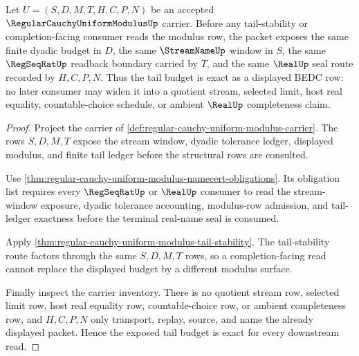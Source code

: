 \begin{theorem}
\label{thm:regular-cauchy-uniform-modulus-tail-budget-exactness}
Let $U=(S,D,M,T,H,C,P,N)$ be an accepted
$\RegularCauchyUniformModulusUp$ carrier. Before any tail-stability or completion-facing consumer reads the modulus row, the packet exposes the same finite dyadic budget in $D$, the same $\StreamNameUp$ window in $S$, the same $\RegSeqRatUp$ readback boundary carried by $T$, and the same $\RealUp$ seal route recorded by $H,C,P,N$. Thus the tail budget is exact as a displayed BEDC row: no later consumer may widen it into a quotient stream, selected limit, host real equality, countable-choice schedule, or ambient $\RealUp$ completeness claim.
\end{theorem}
\begin{proof}
Project the carrier of \autoref{def:regular-cauchy-uniform-modulus-carrier}. The rows $S,D,M,T$ expose the stream window, dyadic tolerance ledger, displayed modulus, and finite tail ledger before the structural rows are consulted.

Use \autoref{thm:regular-cauchy-uniform-modulus-namecert-obligations}. Its obligation list requires every $\RegSeqRatUp$ or $\RealUp$ consumer to read the stream-window exposure, dyadic tolerance accounting, modulus-row admission, and tail-ledger exactness before the terminal real-name seal is consumed.

Apply \autoref{thm:regular-cauchy-uniform-modulus-tail-stability}. The tail-stability route factors through the same $S,D,M,T$ rows, so a completion-facing read cannot replace the displayed budget by a different modulus surface.

Finally inspect the carrier inventory. There is no quotient stream row, selected limit row, host real equality row, countable-choice row, or ambient completeness row, and $H,C,P,N$ only transport, replay, source, and name the already displayed packet. Hence the exposed tail budget is exact for every downstream read.
\end{proof}

